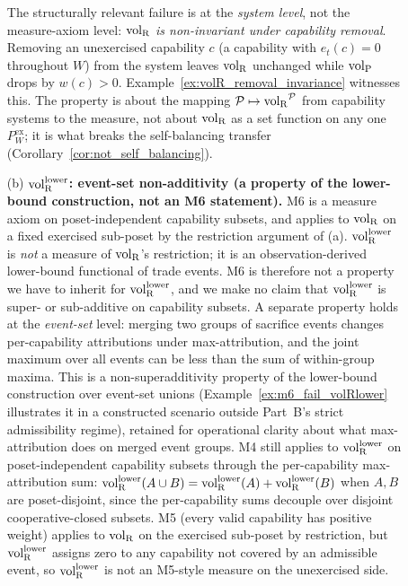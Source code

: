 \begin{theorem}
\begin{description}
\begin{enumerate}
    The structurally relevant failure is at the
    \emph{system level}, not the measure-axiom level:
    \emph{$\volR$ is non-invariant under capability removal}.
    Removing an unexercised capability $c$ (a capability with
    $e_t(c) = 0$ throughout $W$) from the system leaves
    $\volR$ unchanged while $\volL$ drops by $w(c) > 0$.
    Example~\ref{ex:volR_removal_invariance} witnesses this.
    The property is about the mapping $\mathcal{P} \mapsto
    \volR^{\mathcal{P}}$ from capability systems to the measure,
    not about $\volR$ as a set function on any one
    $P^{\mathrm{ex}}_W$; it is what breaks the self-balancing
    transfer (Corollary~\ref{cor:not_self_balancing}).
  \item[(b)] \textbf{${\operatorname{vol}_{\mathrm{R}}^{\mathrm{lower}}}$: event-set non-additivity
    (a property of the lower-bound construction, not an M6
    statement).}
    M6 is a measure axiom on poset-independent capability
    subsets, and applies to $\volR$ on a fixed exercised
    sub-poset by the restriction argument of (a).  ${\operatorname{vol}_{\mathrm{R}}^{\mathrm{lower}}}$
    is \emph{not} a measure of $\volR$'s restriction; it is an
    observation-derived lower-bound functional of trade events.
    M6 is therefore not a property we have to inherit for
    ${\operatorname{vol}_{\mathrm{R}}^{\mathrm{lower}}}$, and we make no claim that ${\operatorname{vol}_{\mathrm{R}}^{\mathrm{lower}}}$ is
    super- or sub-additive on capability subsets.
    A separate property holds at the \emph{event-set}
    level: merging two groups of sacrifice events changes
    per-capability attributions under max-attribution, and the
    joint maximum over all events can be less than the sum of
    within-group maxima.  This is a non-superadditivity property
    of the lower-bound construction over event-set unions
    (Example~\ref{ex:m6_fail_volRlower} illustrates it in a
    constructed scenario outside Part~B's strict admissibility
    regime), retained for operational clarity about what
    max-attribution does on merged event groups.  M4 still
    applies to ${\operatorname{vol}_{\mathrm{R}}^{\mathrm{lower}}}$ on poset-independent capability
    subsets through the per-capability max-attribution sum:
    ${\operatorname{vol}_{\mathrm{R}}^{\mathrm{lower}}}(A \cup B) = {\operatorname{vol}_{\mathrm{R}}^{\mathrm{lower}}}(A) + {\operatorname{vol}_{\mathrm{R}}^{\mathrm{lower}}}(B)$ when
    $A, B$ are poset-disjoint, since the per-capability sums
    decouple over disjoint cooperative-closed subsets.
    M5 (every valid capability has positive weight) applies to
    $\volR$ on the exercised sub-poset by restriction, but
    ${\operatorname{vol}_{\mathrm{R}}^{\mathrm{lower}}}$ assigns zero to any capability not covered by
    an admissible event, so ${\operatorname{vol}_{\mathrm{R}}^{\mathrm{lower}}}$ is not an M5-style
    measure on the unexercised side.
  \end{enumerate}
\end{description}
\end{theorem}

